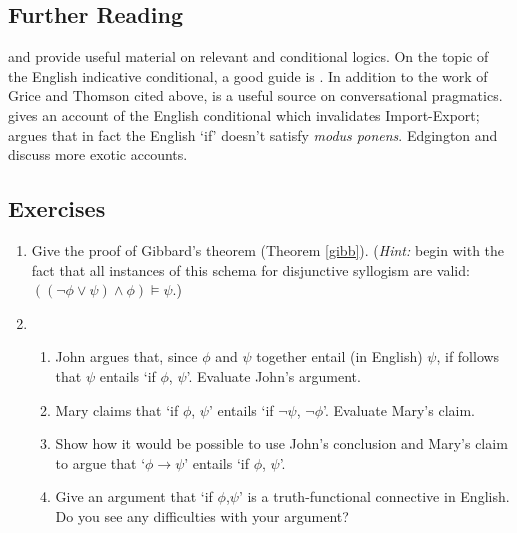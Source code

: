 {\small
\subsection*{Further Reading}


\citet{bevpospa} and \citet{burphilo} provide useful material on relevant and conditional logics. On the topic of the English indicative conditional, a good guide is \citet{edgington}. In addition to the work of Grice and Thomson cited above, \citet{sep-implicature} is a useful source on conversational pragmatics. \citet{stalnaker} gives an account of the English conditional which invalidates Import-Export; \citet{mcgee} argues that in fact the English `if' doesn't satisfy \emph{modus ponens}. Edgington and \citet{kratzer} discuss more exotic accounts.

 



\subsection*{Exercises}


\begin{enumerate}
	

\item Give the proof of Gibbard's theorem (Theorem \ref{gibb}). (\emph{Hint:} begin with the fact that all instances of this schema for disjunctive syllogism are valid: $((¬\phi \vee \psi)\wedge\phi)\vDash\psi$.)
	\item \begin {enumerate} \item John argues that, since $\phi$ and $\psi$ together entail (in English)
	$\psi$, if follows that $\psi$ entails `if $\phi$, $\psi$'. Evaluate John's argument.

		\item Mary claims that `if $\phi$, $\psi$' entails `if $\neg \psi$, $\neg
		\phi$'. Evaluate Mary's claim.
		\item Show how it would be possible to use John's conclusion and
		Mary's claim to argue that `$\phi \to \psi$' entails `if $\phi$,
		$\psi$'.
		\item Give an argument that `if $\phi$,$\psi$' is a truth-functional connective in English. Do you see any difficulties with your argument?

		\end{enumerate}	




\end{enumerate}

}



	









